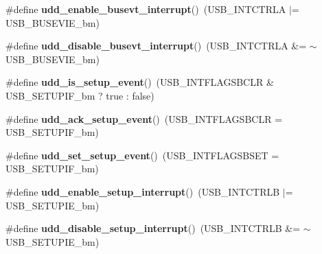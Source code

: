 \begin{DoxyCompactItemize}
\item 
\hypertarget{group__udd__xmega__usb__group_ga8600551b15689155eb66d7e723c5dde6}{\#define {\bfseries udd\-\_\-enable\-\_\-busevt\-\_\-interrupt}()~(U\-S\-B\-\_\-\-I\-N\-T\-C\-T\-R\-L\-A $|$= U\-S\-B\-\_\-\-B\-U\-S\-E\-V\-I\-E\-\_\-bm)}\label{group__udd__xmega__usb__group_ga8600551b15689155eb66d7e723c5dde6}

\item 
\hypertarget{group__udd__xmega__usb__group_gaef343c1d4fcc6dcfa70fd4e278a3f210}{\#define {\bfseries udd\-\_\-disable\-\_\-busevt\-\_\-interrupt}()~(U\-S\-B\-\_\-\-I\-N\-T\-C\-T\-R\-L\-A \&= $\sim$U\-S\-B\-\_\-\-B\-U\-S\-E\-V\-I\-E\-\_\-bm)}\label{group__udd__xmega__usb__group_gaef343c1d4fcc6dcfa70fd4e278a3f210}

\item 
\hypertarget{group__udd__xmega__usb__group_gaa10808b5aca104b7ea9aa83757ef3fa7}{\#define {\bfseries udd\-\_\-is\-\_\-setup\-\_\-event}()~(U\-S\-B\-\_\-\-I\-N\-T\-F\-L\-A\-G\-S\-B\-C\-L\-R \& U\-S\-B\-\_\-\-S\-E\-T\-U\-P\-I\-F\-\_\-bm ? true \-: false)}\label{group__udd__xmega__usb__group_gaa10808b5aca104b7ea9aa83757ef3fa7}

\item 
\hypertarget{group__udd__xmega__usb__group_ga37c1f3b1096f163c8df74c6da700b27f}{\#define {\bfseries udd\-\_\-ack\-\_\-setup\-\_\-event}()~(U\-S\-B\-\_\-\-I\-N\-T\-F\-L\-A\-G\-S\-B\-C\-L\-R = U\-S\-B\-\_\-\-S\-E\-T\-U\-P\-I\-F\-\_\-bm)}\label{group__udd__xmega__usb__group_ga37c1f3b1096f163c8df74c6da700b27f}

\item 
\hypertarget{group__udd__xmega__usb__group_ga9973b54457a96b55f38289f26d114864}{\#define {\bfseries udd\-\_\-set\-\_\-setup\-\_\-event}()~(U\-S\-B\-\_\-\-I\-N\-T\-F\-L\-A\-G\-S\-B\-S\-E\-T = U\-S\-B\-\_\-\-S\-E\-T\-U\-P\-I\-F\-\_\-bm)}\label{group__udd__xmega__usb__group_ga9973b54457a96b55f38289f26d114864}

\item 
\hypertarget{group__udd__xmega__usb__group_ga6fffe17f2db90bf7c4d8bb2e91462c20}{\#define {\bfseries udd\-\_\-enable\-\_\-setup\-\_\-interrupt}()~(U\-S\-B\-\_\-\-I\-N\-T\-C\-T\-R\-L\-B $|$= U\-S\-B\-\_\-\-S\-E\-T\-U\-P\-I\-E\-\_\-bm)}\label{group__udd__xmega__usb__group_ga6fffe17f2db90bf7c4d8bb2e91462c20}

\item 
\hypertarget{group__udd__xmega__usb__group_ga0eafda98d773c26cbed5bdea75a3d84f}{\#define {\bfseries udd\-\_\-disable\-\_\-setup\-\_\-interrupt}()~(U\-S\-B\-\_\-\-I\-N\-T\-C\-T\-R\-L\-B \&= $\sim$U\-S\-B\-\_\-\-S\-E\-T\-U\-P\-I\-E\-\_\-bm)}\label{group__udd__xmega__usb__group_ga0eafda98d773c26cbed5bdea75a3d84f}


\end{DoxyCompactItemize}
